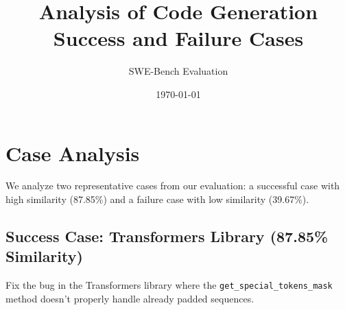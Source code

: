 \documentclass{article}
\title{Analysis of Code Generation Success and Failure Cases}
\author{SWE-Bench Evaluation}
\date{\today}
\begin{document}
\maketitle

\section{Case Analysis}

We analyze two representative cases from our evaluation: a successful case with high similarity (87.85\%) and a failure case with low similarity (39.67\%).

\subsection{Success Case: Transformers Library (87.85\% Similarity)}

\begin{tcolorbox}[colback=LightGreen!10,title=Problem Description]
Fix the bug in the Transformers library where the \texttt{get\_special\_tokens\_mask} method doesn't properly handle already padded sequences.
\end{tcolorbox}
\end{document}
